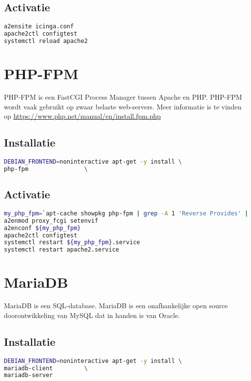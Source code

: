 \subsection{Activatie}
\begin{lstlisting}[language=bash]
a2ensite icinga.conf
apache2ctl configtest
systemctl reload apache2
\end{lstlisting}


\section{PHP-FPM}
PHP-FPM is een FastCGI Process Manager tussen Apache en PHP. PHP-FPM wordt vaak gebruikt op zwaar belaste web-servers. Meer informatie is te vinden op \url{https://www.php.net/manual/en/install.fpm.php}

\subsection{Installatie}
\begin{lstlisting}[language=bash]
DEBIAN_FRONTEND=noninteractive apt-get -y install \
php-fpm                \
\end{lstlisting}

\subsection{Activatie}
\begin{lstlisting}[language=bash]
my_php_fpm=`apt-cache showpkg php-fpm | grep -A 1 'Reverse Provides' | tail -1 | cut -d' ' -f1`
a2enmod proxy_fcgi setenvif
a2enconf ${my_php_fpm}
apache2ctl configtest
systemctl restart ${my_php_fpm}.service
systemctl restart apache2.service
\end{lstlisting}

\section{MariaDB}
MariaDB is een SQL-database. MariaDB is een onafhankelijke open source doorontwikkeling van MySQL dat in handen is van Oracle.

\subsection{Installatie}
\begin{lstlisting}[language=bash]
DEBIAN_FRONTEND=noninteractive apt-get -y install \
mariadb-client         \
mariadb-server         
\end{lstlisting}

